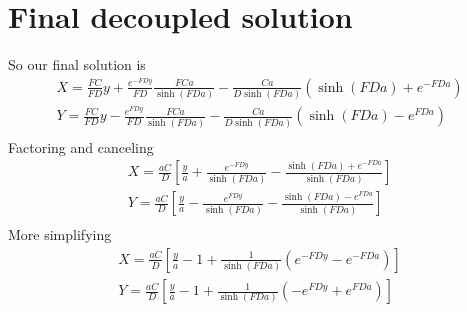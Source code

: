 \documentclass[11pt]{article}
\begin{document}
\section{Final decoupled solution}
So our final solution is
\begin{equation}\begin{aligned}
	X = \frac{FC}{FD} y + \frac{e^{-FD y}}{FD} \frac{FCa}{\sinh(FD a)} - \frac{Ca}{D\sinh(FD a)} (\sinh(FD a) + e^{-FD a}) \\
	Y = \frac{FC}{FD} y - \frac{e^{ FD y}}{FD} \frac{FCa}{\sinh(FD a)} - \frac{Ca}{D\sinh(FD a)} (\sinh(FD a) - e^{ FD a}) \\
\end{aligned} \end{equation}
Factoring and canceling
\begin{equation}\begin{aligned}
	X = \frac{aC}{D} \left[ \frac{y}{a} + \frac{e^{-FD y}}{\sinh(FD a)} - \frac{\sinh(FD a) + e^{-FD a}}{\sinh(FD a)} \right] \\
	Y = \frac{aC}{D} \left[ \frac{y}{a} - \frac{e^{ FD y}}{\sinh(FD a)} - \frac{\sinh(FD a) - e^{ FD a}}{\sinh(FD a)} \right] \\
\end{aligned} \end{equation}
More simplifying
\begin{equation}\begin{aligned}
	X = \frac{aC}{D} \left[ \frac{y}{a} - 1 + \frac{1}{\sinh(FD a)} \left(   e^{-FD y} - e^{-FD a} \right) \right] \\
	Y = \frac{aC}{D} \left[ \frac{y}{a} - 1 + \frac{1}{\sinh(FD a)} \left( - e^{ FD y} + e^{ FD a} \right) \right] \\
\end{aligned} \end{equation}
\end{document}
